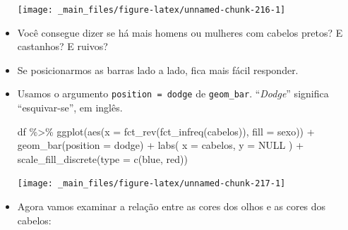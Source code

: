 \documentclass[
  11pt]{report}
\newenvironment{Shaded}{\begin{snugshade}}{\end{snugshade}}
\newcommand{\AttributeTok}[1]{\textcolor[rgb]{0.77,0.63,0.00}{#1}}
\newcommand{\ConstantTok}[1]{\textcolor[rgb]{0.00,0.00,0.00}{#1}}
\newcommand{\FunctionTok}[1]{\textcolor[rgb]{0.00,0.00,0.00}{#1}}
\newcommand{\NormalTok}[1]{#1}
\newcommand{\SpecialCharTok}[1]{\textcolor[rgb]{0.00,0.00,0.00}{#1}}
\newcommand{\StringTok}[1]{\textcolor[rgb]{0.31,0.60,0.02}{#1}}
\renewenvironment{Shaded}{
    \begin{mdframed}[%
      roundcorner=2pt,%
      innerleftmargin=5pt,%
      innerrightmargin=5pt,%
      topline=true,%
      leftline=true,%
      rightline=true,%
      bottomline=true,%
      linewidth=0.5pt,%
      linecolor=black!20,%
      backgroundcolor=black!2,%
      skipabove=2ex,%
      skipbelow=2.5ex%
    ]%
  }
  {
    \end{mdframed}
  }
\begin{document}
\begin{itemize}
  \begin{center}\texttt{[image: \_main\_files/figure-latex/unnamed-chunk-216-1]} \end{center}
\item
  Você consegue dizer se há mais homens ou mulheres com cabelos pretos? E castanhos? E ruivos?
\item
  Se posicionarmos as barras lado a lado, fica mais fácil responder.
\item
  Usamos o argumento \texttt{position\ =\ \textquotesingle{}dodge\textquotesingle{}} de \texttt{geom\_bar}. ``\emph{Dodge}'' significa ``esquivar-se'', em inglês.

\begin{Shaded}
\begin{Highlighting}[]
\NormalTok{df }\SpecialCharTok{\%\textgreater{}\%} 
  \FunctionTok{ggplot}\NormalTok{(}\FunctionTok{aes}\NormalTok{(}\AttributeTok{x =} \FunctionTok{fct\_rev}\NormalTok{(}\FunctionTok{fct\_infreq}\NormalTok{(cabelos)), }\AttributeTok{fill =}\NormalTok{ sexo)) }\SpecialCharTok{+}
    \FunctionTok{geom\_bar}\NormalTok{(}\AttributeTok{position =} \StringTok{\textquotesingle{}dodge\textquotesingle{}}\NormalTok{) }\SpecialCharTok{+}
    \FunctionTok{labs}\NormalTok{(}
      \AttributeTok{x =} \StringTok{\textquotesingle{}cabelos\textquotesingle{}}\NormalTok{,}
      \AttributeTok{y =} \ConstantTok{NULL}
\NormalTok{    ) }\SpecialCharTok{+}
    \FunctionTok{scale\_fill\_discrete}\NormalTok{(}\AttributeTok{type =} \FunctionTok{c}\NormalTok{(}\StringTok{\textquotesingle{}blue\textquotesingle{}}\NormalTok{, }\StringTok{\textquotesingle{}red\textquotesingle{}}\NormalTok{))}
\end{Highlighting}
\end{Shaded}

  \begin{center}\texttt{[image: \_main\_files/figure-latex/unnamed-chunk-217-1]} \end{center}
\item
  Agora vamos examinar a relação entre as cores dos olhos e as cores dos cabelos:


\end{itemize}
\end{document}
